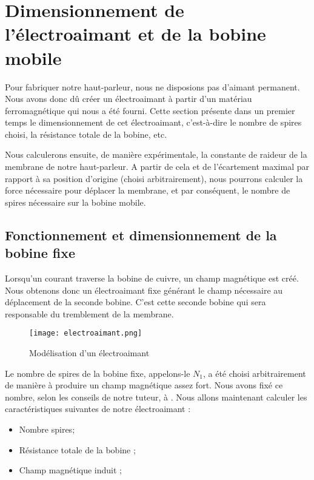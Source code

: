 

\section{Dimensionnement de l'électroaimant et de la bobine mobile}
Pour fabriquer notre haut-parleur, nous ne disposions pas d'aimant permanent. Nous avons donc
dû créer un électroaimant à partir d'un matériau ferromagnétique qui nous a été fourni.
Cette section présente dans un premier temps le dimensionnement de cet électroaimant, c'est-à-dire le
nombre de spires choisi, la résistance totale de la bobine, etc.

Nous calculerons ensuite, de manière expérimentale, la constante de raideur de la membrane de
notre haut-parleur. A partir de cela et de l'écartement maximal par rapport à sa position d'origine 
(choisi arbitrairement), 
nous pourrons calculer la force nécessaire pour déplacer la membrane, et par conséquent, le nombre
de spires nécessaire sur la bobine mobile.

\subsection{Fonctionnement et dimensionnement de la bobine fixe}
Lorsqu'un courant traverse la bobine de cuivre, un champ magnétique est créé.  Nous obtenons 
donc un électroaimant fixe générant le champ nécessaire au déplacement de la seconde bobine. 
C'est cette seconde bobine qui sera responsable du tremblement de la membrane.

\begin{figure}[ht!]
\centering
\texttt{[image: electroaimant.png]}
\caption{Modélisation d'un électroaimant}
\label{modélisation de l'électroaimant}
\end{figure}

Le nombre de spires de la bobine fixe, appelons-le $N_1$, a été choisi arbitrairement de manière à produire un
champ magnétique assez fort. Nous avons fixé ce nombre, selon les conseils de notre tuteur, à . 
Nous allons maintenant calculer les caractéristiques suivantes de notre électroaimant :

\begin{itemize}
	\item Nombre spires;
	\item Résistance totale de la bobine ;
	\item Champ magnétique induit ;
\end{itemize}

